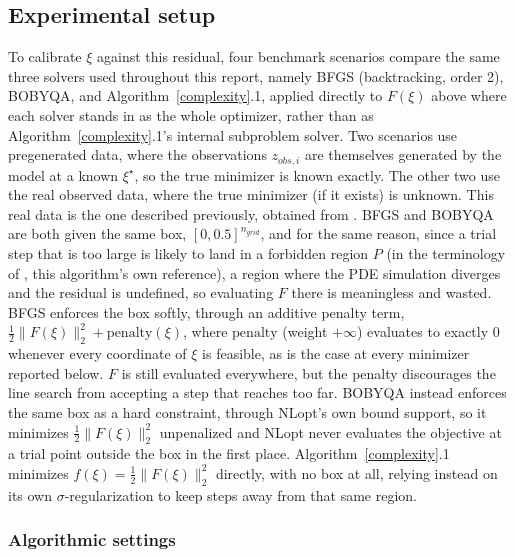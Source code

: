 \documentclass{article}
\begin{document}
\subsection{Experimental setup}
To calibrate $\xi$ against this residual, four benchmark scenarios
compare the same three solvers used throughout this report, namely BFGS
(backtracking, order 2), BOBYQA, and Algorithm~\ref{complexity}.1, applied
directly to $F(\xi)$ above where each solver stands in as the
whole optimizer, rather than as Algorithm~\ref{complexity}.1's internal
subproblem solver. Two scenarios use pregenerated data, where the
observations $z_{obs,i}$ are themselves generated by the model at a known
$\xi^\star$, so the true minimizer is known exactly. The other two use
the real observed data, where the true minimizer (if it exists) is
unknown. This real data is the one described previously, obtained from \cite{meade1979}. BFGS and BOBYQA
are both given the same box, $[0,0.5]^{n_{grid}}$,
and for the same reason, since a trial step that is too large
is likely to land in a forbidden region $P$ (in the terminology of
\cite{FortunatoMartinez2025}, this algorithm's own reference), a region
where the PDE simulation diverges and the residual is undefined, so
evaluating $F$ there is meaningless and wasted. BFGS enforces the box softly,
through an additive penalty term, $\frac12\|F(\xi)\|_2^2 +
\mathrm{penalty}(\xi)$, where $\mathrm{penalty}$ (weight $+\infty$)
evaluates to exactly $0$ whenever every coordinate of $\xi$ is feasible,
as is the case at every minimizer reported below. $F$ is still evaluated
everywhere, but the penalty discourages the line search from accepting
a step that reaches too far. BOBYQA instead enforces the same box as a
hard constraint, through NLopt's own bound support, so it minimizes
$\frac12\|F(\xi)\|_2^2$ unpenalized and NLopt never evaluates the
objective at a trial point outside the box in the first place.
Algorithm~\ref{complexity}.1
minimizes $f(\xi) = \frac12\|F(\xi)\|_2^2$ directly, with no box at all,
relying instead on its own $\sigma$-regularization to keep steps away
from that same region.

\subsubsection{Algorithmic settings}
\end{document}
